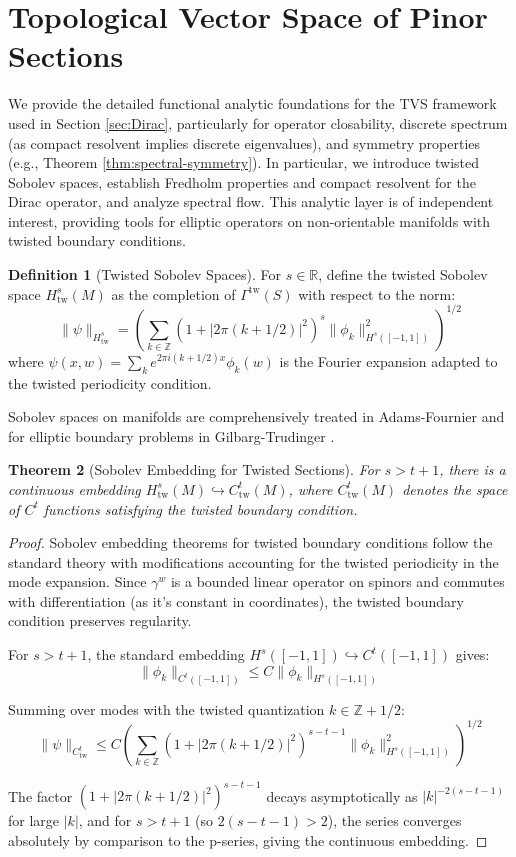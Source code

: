 \documentclass[11pt]{amsart}
\newtheorem{theorem}{Theorem}[section]
\theoremstyle{definition}
\newtheorem{definition}[theorem]{Definition}
\theoremstyle{remark}
\newcommand{\RR}{\mathbb{R}}
\newcommand{\ZZ}{\mathbb{Z}}
\begin{document}
\section{Topological Vector Space of Pinor Sections}\label{app:tvs}

We provide the detailed functional analytic foundations for the TVS framework used in Section \ref{sec:Dirac}, particularly for operator closability, discrete spectrum (as compact resolvent implies discrete eigenvalues), and symmetry properties (e.g., Theorem \ref{thm:spectral-symmetry}). In particular, we introduce twisted Sobolev spaces, establish Fredholm properties and compact resolvent for the Dirac operator, and analyze spectral flow. This analytic layer is of independent interest, providing tools for elliptic operators on non-orientable manifolds with twisted boundary conditions.

\begin{definition}[Twisted Sobolev Spaces]\label{def:twisted-sobolev}
For $s \in \RR$, define the twisted Sobolev space $H^s_{\mathrm{tw}}(M)$ as the completion of $\Gamma^{\mathrm{tw}}(S)$ with respect to the norm:
\[
\|\psi\|_{H^s_{\mathrm{tw}}} = \left(\sum_{k \in \ZZ} (1 + |2\pi(k+1/2)|^2)^s \|\phi_k\|_{H^s([-1,1])}^2\right)^{1/2}
\]
where $\psi(x,w) = \sum_k e^{2\pi i(k+1/2)x}\phi_k(w)$ is the Fourier expansion adapted to the twisted periodicity condition.
\end{definition}

Sobolev spaces on manifolds are comprehensively treated in Adams-Fournier \cite{Adams1996} and for elliptic boundary problems in Gilbarg-Trudinger \cite{Gilbarg1977}.

\begin{theorem}[Sobolev Embedding for Twisted Sections]\label{thm:twisted-embedding}
For $s > t + 1$, there is a continuous embedding $H^s_{\mathrm{tw}}(M) \hookrightarrow C^t_{\mathrm{tw}}(M)$, where $C^t_{\mathrm{tw}}(M)$ denotes the space of $C^t$ functions satisfying the twisted boundary condition.
\end{theorem}

\begin{proof}
Sobolev embedding theorems for twisted boundary conditions follow the standard theory \cite{Adams1996} with modifications accounting for the twisted periodicity in the mode expansion. Since $\gamma^w$ is a bounded linear operator on spinors and commutes with differentiation (as it's constant in coordinates), the twisted boundary condition preserves regularity.

For $s > t + 1$, the standard embedding $H^s([-1,1]) \hookrightarrow C^t([-1,1])$ gives:
\[
\|\phi_k\|_{C^t([-1,1])} \leq C \|\phi_k\|_{H^s([-1,1])}
\]

Summing over modes with the twisted quantization $k \in \ZZ + 1/2$:
\[
\|\psi\|_{C^t_{\mathrm{tw}}} \leq C \left(\sum_{k \in \ZZ} (1 + |2\pi(k+1/2)|^2)^{s-t-1} \|\phi_k\|_{H^s([-1,1])}^2\right)^{1/2}
\]

The factor $(1 + |2\pi(k+1/2)|^2)^{s-t-1}$ decays asymptotically as $|k|^{-2(s-t-1)}$ for large $|k|$, and for $s > t + 1$ (so $2(s-t-1) > 2$), the series converges absolutely by comparison to the p-series, giving the continuous embedding.
\end{proof}
\end{document}
